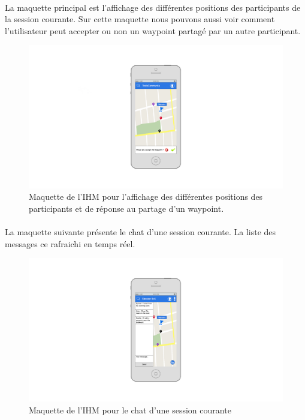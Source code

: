 \documentclass[titlepage, 12pt]{report}
\begin{document}
\clearpage

\paragraph{}La maquette principal est l'affichage des différentes positions des participants de la session courante. Sur cette maquette nous pouvons aussi voir comment l'utilisateur peut accepter ou non un waypoint partagé par un autre participant.

\begin{figure}[!h]
	\caption{Maquette de l'IHM pour l'affichage des différentes positions des participants et de réponse au partage d'un waypoint.}
	\label{session_view}
	\centering
	\includegraphics[scale=0.3]{images/mockups/session_marker.png}
\end{figure}

\clearpage

\paragraph{}La maquette suivante présente le chat d'une session courante. La liste des messages ce rafraichi en temps réel.

\begin{figure}[!h]
	\caption{Maquette de l'IHM pour le chat d'une session courante}
	\label{chat_view}
	\centering
	\includegraphics[scale=0.3]{images/mockups/chat.png}
\end{figure}
\end{document}

